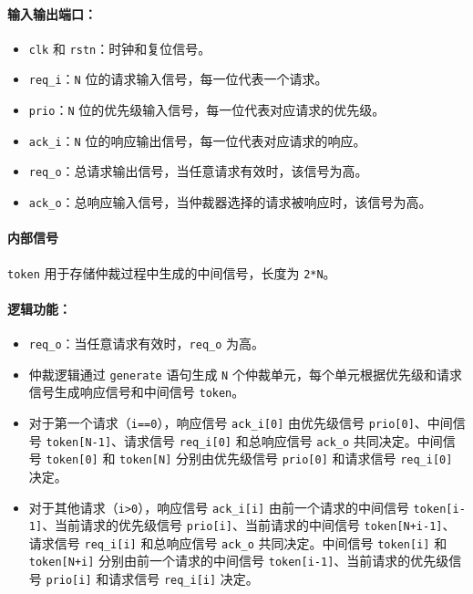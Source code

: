 \documentclass[a4paper]{article}
\begin{document}
\paragraph{输入输出端口：}
\begin{itemize}
    \item \texttt{clk} 和 \texttt{rstn}：时钟和复位信号。
    \item \texttt{req\_i}：\texttt{N} 位的请求输入信号，每一位代表一个请求。
    \item \texttt{prio}：\texttt{N} 位的优先级输入信号，每一位代表对应请求的优先级。
    \item \texttt{ack\_i}：\texttt{N} 位的响应输出信号，每一位代表对应请求的响应。
    \item \texttt{req\_o}：总请求输出信号，当任意请求有效时，该信号为高。
    \item \texttt{ack\_o}：总响应输入信号，当仲裁器选择的请求被响应时，该信号为高。
\end{itemize}

\paragraph{内部信号} \texttt{token} 用于存储仲裁过程中生成的中间信号，长度为 \texttt{2*N}。

\paragraph{逻辑功能：}
\begin{itemize}
    \item \texttt{req\_o}：当任意请求有效时，\texttt{req\_o} 为高。
    \item 仲裁逻辑通过 \texttt{generate} 语句生成 \texttt{N} 个仲裁单元，每个单元根据优先级和请求信号生成响应信号和中间信号 \texttt{token}。
    \item 对于第一个请求（\texttt{i==0}），响应信号 \texttt{ack\_i[0]} 由优先级信号 \texttt{prio[0]}、中间信号 \texttt{token[N-1]}、请求信号 \texttt{req\_i[0]} 和总响应信号 \texttt{ack\_o} 共同决定。中间信号 \texttt{token[0]} 和 \texttt{token[N]} 分别由优先级信号 \texttt{prio[0]} 和请求信号 \texttt{req\_i[0]} 决定。
    \item 对于其他请求（\texttt{i>0}），响应信号 \texttt{ack\_i[i]} 由前一个请求的中间信号 \texttt{token[i-1]}、当前请求的优先级信号 \texttt{prio[i]}、当前请求的中间信号 \texttt{token[N+i-1]}、请求信号 \texttt{req\_i[i]} 和总响应信号 \texttt{ack\_o} 共同决定。中间信号 \texttt{token[i]} 和 \texttt{token[N+i]} 分别由前一个请求的中间信号 \texttt{token[i-1]}、当前请求的优先级信号 \texttt{prio[i]} 和请求信号 \texttt{req\_i[i]} 决定。
\end{itemize}
\end{document}
